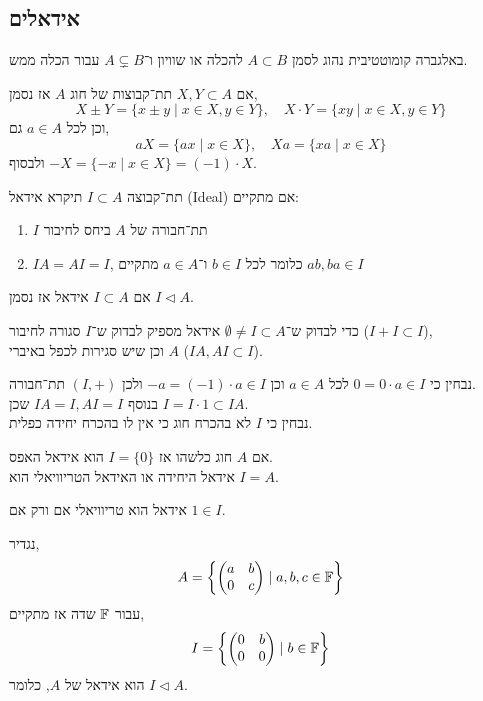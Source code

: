 \subsection{אידאלים}
באלגברה קומוטטיבית נהוג לסמן $A \subset B$ להכלה או שוויון ו־$A \subsetneq B$ עבור הכלה ממש. \\
\begin{notation}
	אם $X, Y \subset A$ תת־קבוצות של חוג $A$ אז נסמן,
	\[
		X \pm Y
		= \{ x \pm y \mid x \in X, y \in Y \},
		\quad
		X \cdot Y
		= \{ x y \mid x \in X, y \in Y \}
	\]
	וכן לכל $a \in A$ גם,
	\[
		a X
		= \{ a x \mid x \in X \},
		\quad
		X a
		= \{ x a \mid x \in X \}
	\]
	ולבסוף $-X = \{ -x \mid x \in X \} = (-1) \cdot X$.
\end{notation}
\begin{definition}[אידאל]
	תת־קבוצה $I \subset A$ תיקרא אידאל (Ideal) אם מתקיים:
	\begin{enumerate}
		\item $I$ תת־חבורה של $A$ ביחס לחיבור
		\item $I A = A I = I$, כלומר לכל $b \in I$ ו־$a \in A$ מתקיים $a b, b a \in I$
	\end{enumerate}
\end{definition}
\begin{notation}
	אם $I \subset A$ אידאל אז נסמן $I \triangleleft A$.
\end{notation}
\begin{remark}
	כדי לבדוק ש־$\emptyset \ne I \subset A$ אידאל מספיק לבדוק ש־$I$ סגורה לחיבור ($I + I \subset I$), \\
	וכן שיש סגירות לכפל באיברי $A$ ($I A, A I \subset I$).
\end{remark}
נבחין כי $0 = 0 \cdot a \in I$ לכל $a \in A$ וכן $-a = (-1) \cdot a \in I$ ולכן $(I, +)$ תת־חבורה. \\
בנוסף $I A = I, A I = I$ שכן $I = I \cdot 1 \subset I A$. \\
נבחין כי $I$ לא בהכרח חוג כי אין לו בהכרח יחידה כפלית.
\begin{example}
	אם $A$ חוג כלשהו אז $I = \{ 0 \}$ הוא אידאל האפס. \\
	אידאל היחידה או האידאל הטריוויאלי הוא $I = A$.
\end{example}
\begin{corollary}
	אידאל הוא טריוויאלי אם ורק אם $1 \in I$.
\end{corollary}
\begin{example}
	נגדיר,
	\[
		A
		= \left\{ \begin{pmatrix} a & b \\ 0 & c \end{pmatrix} \mid a, b, c \in \mathbb{F} \right\}
	\]
	עבור $\mathbb{F}$ שדה
	 אז מתקיים,
	 \[
	 	I
		= \left\{ \begin{pmatrix} 0 & b \\ 0 & 0 \end{pmatrix} \mid b \in \mathbb{F} \right\}
	 \]
	 הוא אידאל של $A$, כלומר $I \triangleleft A$.
\end{example}
